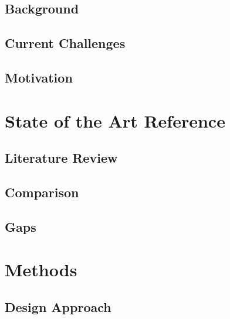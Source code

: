 \documentclass[12pt,oneside,a4paper]{article}
\begin{document}
\subsection{Background}

\subsection{Current Challenges}

\subsection{Motivation}


\section{State of the Art Reference} 

\subsection{Literature Review}

\subsection{Comparison}

\subsection{Gaps}



\section{Methods} 

\subsection{Design Approach}
\end{document}
